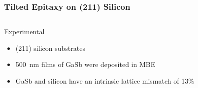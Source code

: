 \documentclass[]{beamer}%
\begin{document}
\begin{frame}
\begin{columns}
\begin{column}{0.5\textwidth}
        \end{column}
    \end{columns}
\end{frame}

\begin{frame}
    \frametitle{Tilted Epitaxy on (211) Silicon}
    \begin{columns}
        \begin{column}{0.5\textwidth}
            \begin{block}{Experimental}
                \begin{itemize}[<+-| alert@+>]
                    \item (211) silicon substrates
                    \item 500~nm films of GaSb were deposited in MBE
                    \item GaSb and silicon have an intrinsic lattice mismatch of 13\%
                \end{itemize}
            \end{block}
        \end{column}
        \begin{column}{0.5\textwidth}
            \centering

\end{column}
\end{columns}
\end{frame}
\end{document}
